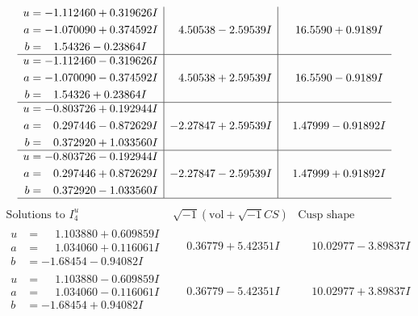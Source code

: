 \documentclass[1p]{elsarticle_modified}
\theoremstyle{definition}
\newcommand{\I}{\sqrt{-1}}
\begin{document}
$$\begin{array}{c|c|c}
\begin{aligned}
u &= -1.112460 + 0.319626 I \\
a &= -1.070090 + 0.374592 I \\
b &= \phantom{-}1.54326 - 0.23864 I\end{aligned}
 & \phantom{-}4.50538 - 2.59539 I & \phantom{-}16.5590 + 0.9189 I \\ \hline\begin{aligned}
u &= -1.112460 - 0.319626 I \\
a &= -1.070090 - 0.374592 I \\
b &= \phantom{-}1.54326 + 0.23864 I\end{aligned}
 & \phantom{-}4.50538 + 2.59539 I & \phantom{-}16.5590 - 0.9189 I \\ \hline\begin{aligned}
u &= -0.803726 + 0.192944 I \\
a &= \phantom{-}0.297446 - 0.872629 I \\
b &= \phantom{-}0.372920 + 1.033560 I\end{aligned}
 & -2.27847 + 2.59539 I & \phantom{-}1.47999 - 0.91892 I \\ \hline\begin{aligned}
u &= -0.803726 - 0.192944 I \\
a &= \phantom{-}0.297446 + 0.872629 I \\
b &= \phantom{-}0.372920 - 1.033560 I\end{aligned}
 & -2.27847 - 2.59539 I & \phantom{-}1.47999 + 0.91892 I\\
 \hline 
 \end{array}$$\newpage$$\begin{array}{c|c|c}  
\text{Solutions to }I^u_{4}& \I (\text{vol} + \sqrt{-1}CS) & \text{Cusp shape}\\
 \hline 
\begin{aligned}
u &= \phantom{-}1.103880 + 0.609859 I \\
a &= \phantom{-}1.034060 + 0.116061 I \\
b &= -1.68454 - 0.94082 I\end{aligned}
 & \phantom{-}0.36779 + 5.42351 I & \phantom{-}10.02977 - 3.89837 I \\ \hline\begin{aligned}
u &= \phantom{-}1.103880 - 0.609859 I \\
a &= \phantom{-}1.034060 - 0.116061 I \\
b &= -1.68454 + 0.94082 I\end{aligned}
 & \phantom{-}0.36779 - 5.42351 I & \phantom{-}10.02977 + 3.89837 I \\ \hline\begin{aligned}

\end{aligned}
\end{array}$$
\end{document}
